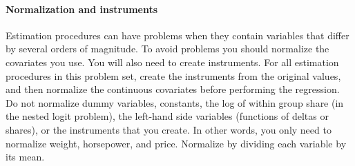 \documentclass[12pt]{article}
\begin{document}
\paragraph{Normalization and instruments} Estimation procedures can have problems when they contain variables that differ by several orders of magnitude. To avoid problems you should normalize the covariates you use. You will also need to create instruments. For all estimation procedures in this problem set, create the instruments from the original values, and then normalize the continuous covariates before performing the regression. Do not normalize dummy variables, constants, the log of within group share (in the nested logit problem), the left-hand side variables (functions of deltas or shares), or the instruments that you create. In other words, you only need to normalize weight, horsepower, and price. Normalize by dividing each variable by its mean. \\
\end{document}
